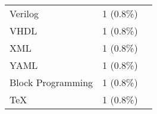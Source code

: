 \begin{table}[ht]
\begin{tabular}{l c p{4cm}}
		Verilog & 1 (0.8\%) & \cite{kruger2024performance} \\
		VHDL & 1 (0.8\%) & \cite{kruger2024performance} \\
		XML & 1 (0.8\%) & \cite{kruger2024performance} \\
		YAML & 1 (0.8\%) & \cite{kruger2024performance} \\
		Block Programming & 1 (0.8\%) & \cite{kazemitabaar2024novices} \\
		TeX & 1 (0.8\%) & \cite{feng2024more} \\
	\bottomrule
    \end{tabular}
    \label{tab:llms}
\end{table}